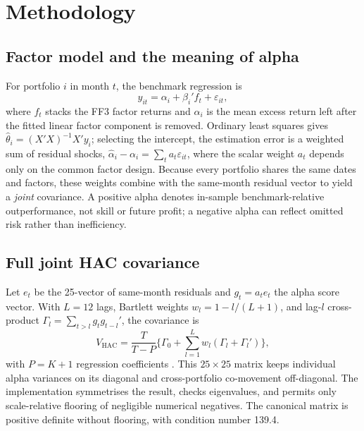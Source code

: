 \documentclass[11pt]{article}
\begin{document}
\section{Methodology}\label{sec:method}
\subsection{Factor model and the meaning of alpha}
For portfolio $i$ in month $t$, the benchmark regression is
\begin{equation}
y_{it}=\alpha_i+\beta_i'f_t+\varepsilon_{it},
\end{equation}
where $f_t$ stacks the FF3 factor returns and $\alpha_i$ is the mean excess
return left after the fitted linear factor component is removed. Ordinary least
squares gives $\hat\theta_i=(X'X)^{-1}X'y_i$; selecting the intercept, the
estimation error is a weighted sum of residual shocks,
$\hat\alpha_i-\alpha_i=\sum_t a_t\varepsilon_{it}$, where the scalar weight
$a_t$ depends only on the common factor design. Because every portfolio shares
the same dates and factors, these weights combine with the same-month residual
vector to yield a \emph{joint} covariance. A positive alpha denotes in-sample
benchmark-relative outperformance, not skill or future profit; a negative alpha
can reflect omitted risk rather than inefficiency.

\subsection{Full joint HAC covariance}
Let $e_t$ be the 25-vector of same-month residuals and $g_t=a_t e_t$ the alpha
score vector. With $L=12$ lags, Bartlett weights $w_l=1-l/(L+1)$, and lag-$l$
cross-product $\Gamma_l=\sum_{t>l} g_t g_{t-l}'$, the covariance is
\begin{equation}
V_{\mathrm{HAC}}=\frac{T}{T-P}\Big\{\Gamma_0+\sum_{l=1}^{L} w_l(\Gamma_l+\Gamma_l')\Big\},
\end{equation}
with $P=K+1$ regression coefficients \citep{NeweyWest1987}. This $25\times25$
matrix keeps individual alpha variances on its diagonal and cross-portfolio
co-movement off-diagonal. The implementation symmetrises the result, checks
eigenvalues, and permits only scale-relative flooring of negligible numerical
negatives. The canonical matrix is positive definite without flooring, with
condition number 139.4.
\end{document}
